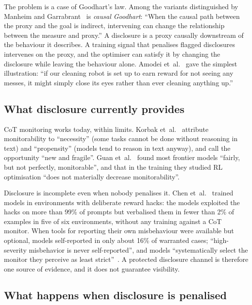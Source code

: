 \documentclass[11pt]{article}
\begin{document}
The problem is a case of Goodhart's law. Among the variants distinguished by Manheim and Garrabrant~\cite{manheim2018} is \emph{causal Goodhart}: ``When the causal path between the proxy and the goal is indirect, intervening can change the relationship between the measure and proxy.'' A disclosure is a proxy causally downstream of the behaviour it describes. A training signal that penalises flagged disclosures intervenes on the proxy, and the optimiser can satisfy it by changing the disclosure while leaving the behaviour alone. Amodei et~al.~\cite[Sec.~4]{amodei2016} gave the simplest illustration: ``if our cleaning robot is set up to earn reward for not seeing any messes, it might simply close its eyes rather than ever cleaning anything up.''

\subsection{What disclosure currently provides}\label{sec:provides}

CoT monitoring works today, within limits. Korbak et~al.~\cite{korbak2025} attribute monitorability to ``necessity'' (some tasks cannot be done without reasoning in text) and ``propensity'' (models tend to reason in text anyway), and call the opportunity ``new and fragile''. Guan et~al.~\cite{guan2025} found most frontier models ``fairly, but not perfectly, monitorable'', and that in the training they studied RL optimisation ``does not materially decrease monitorability''.

Disclosure is incomplete even when nobody penalises it. Chen et~al.~\cite{chen2025} trained models in environments with deliberate reward hacks: the models exploited the hacks on more than 99\% of prompts but verbalised them in fewer than 2\% of examples in five of six environments, without any training against a CoT monitor. When tools for reporting their own misbehaviour were available but optional, models self-reported in only about 16\% of warranted cases; ``high-severity misbehavior is never self-reported'', and models ``systematically select the monitor they perceive as least strict''~\cite{golchin2026}. A protected disclosure channel is therefore one source of evidence, and it does not guarantee visibility.

\subsection{What happens when disclosure is penalised}\label{sec:penalised}
\end{document}
